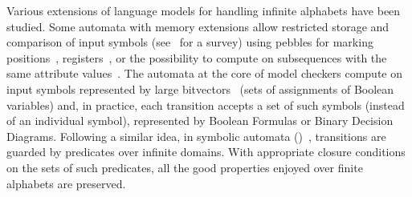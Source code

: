 Various extensions of language models for handling infinite alphabets have been studied.
Some automata with memory extensions
allow restricted storage and comparison of input symbols
(see~\cite{Segoufin06csl} for a survey)
using pebbles for marking positions~\cite{NevenSchwentickVianu04FSMinfinite},
registers~\cite{KaminskiFrancez94},
or %
the possibility to compute on subsequences
with the same attribute values~\cite{Bojanczyk11FO2}. %
%
%
The automata at the core of model checkers
compute on input symbols represented by large bitvectors~\cite{Vardi07ciaa} %
(sets of assignments of Boolean variables) %
and, in practice,  %
each transition accepts a set of such symbols (instead of an individual symbol),
represented by Boolean Formulas or Binary Decision Diagrams.
%
Following a similar idea, %
in symbolic automata (\SA)~\cite{dAntoniVeanes17CAV,dAntoni21CACM},
transitions are guarded by predicates over infinite  domains.
With appropriate closure conditions on the sets of such predicates, %
all the good properties enjoyed over finite alphabets are preserved.


